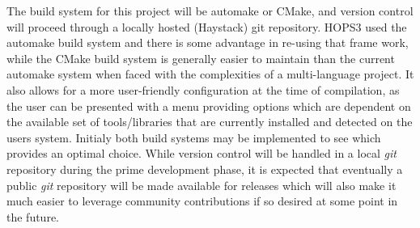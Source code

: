 The build system for this project will be automake or CMake, and version control will proceed through a locally hosted (Haystack) git repository. HOPS3 used the automake build system and there is some
advantage in re-using that frame work, while the CMake build system is generally easier to maintain than the current automake system when faced with the complexities of a multi-language project. It also allows for a more user-friendly configuration at the time of compilation, as the user can be presented with a menu providing options which are dependent on the available set of tools/libraries that are currently installed and detected on the users system. Initialy
both build systems may be implemented to see which provides an optimal choice. While version control will be handled in a local \textit{git} repository during
the prime development phase, it is expected that eventually a public \textit{git} repository will be made available for releases which will also make it much easier to leverage community contributions if so desired at some point in the future.
